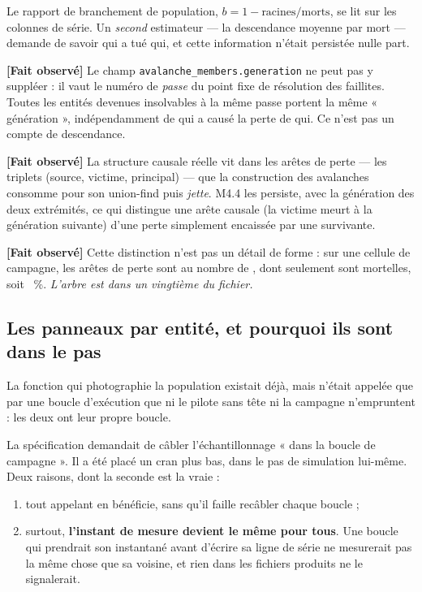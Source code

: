 \documentclass[11pt,a4paper]{article}
\newcommand{\code}[1]{\texttt{#1}}
\newcommand{\fait}{\textbf{[Fait observé]}}
\begin{document}
Le rapport de branchement de population, $b = 1 - \text{racines}/\text{morts}$,
se lit sur les colonnes de série. Un \emph{second} estimateur --- la
descendance moyenne par mort --- demande de savoir qui a tué qui, et cette
information n'était persistée nulle part.

\fait{} Le champ \code{avalanche\_members.generation} ne peut pas y suppléer :
il vaut le numéro de \emph{passe} du point fixe de résolution des faillites.
Toutes les entités devenues insolvables à la même passe portent la même
« génération », indépendamment de qui a causé la perte de qui. Ce n'est pas
un compte de descendance.

\fait{} La structure causale réelle vit dans les arêtes de perte
--- les triplets (source, victime, principal) --- que la construction des
avalanches consomme pour son union-find puis \emph{jette}. M4.4 les persiste,
avec la génération des deux extrémités, ce qui distingue une arête causale
(la victime meurt à la génération suivante) d'une perte simplement encaissée
par une survivante.

\fait{} Cette distinction n'est pas un détail de forme : sur une cellule de
campagne, les arêtes de perte sont au nombre de \LotAAretes{}, dont
\LotAAretesMortelles{} seulement sont mortelles, soit \LotAPartMortelle~\%.
\emph{L'arbre est dans un vingtième du fichier.}

\subsection{Les panneaux par entité, et pourquoi ils sont dans le pas}

La fonction qui photographie la population existait déjà, mais n'était
appelée que par une boucle d'exécution que ni le pilote sans tête ni la
campagne n'empruntent : les deux ont leur propre boucle.

La spécification demandait de câbler l'échantillonnage « dans la boucle de
campagne ». Il a été placé un cran plus bas, dans le pas de simulation
lui-même. Deux raisons, dont la seconde est la vraie :

\begin{enumerate}
\item tout appelant en bénéficie, sans qu'il faille recâbler chaque boucle ;
\item surtout, \textbf{l'instant de mesure devient le même pour tous}. Une
      boucle qui prendrait son instantané avant d'écrire sa ligne de série ne
      mesurerait pas la même chose que sa voisine, et rien dans les fichiers
      produits ne le signalerait.
\end{enumerate}
\end{document}
